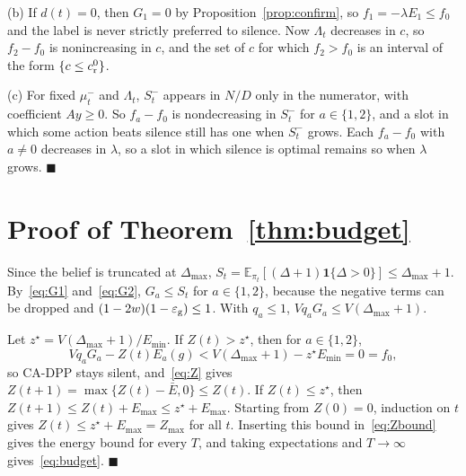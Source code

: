 \documentclass[5p,twocolumn]{elsarticle}
\theoremstyle{remark}
\newcommand{\E}{\mathbb{E}}
\newcommand{\ind}[1]{\mathbf{1}\{#1\}}
\newcommand{\ee}{\varepsilon}
\begin{document}
(b) If $d(t)=0$, then $G_1=0$ by Proposition~\ref{prop:confirm}, so $f_1=-\lambda E_1\le f_0$ and the label is never strictly preferred to silence. Now $\Lambda_t$ decreases in $c$, so $f_2-f_0$ is nonincreasing in $c$, and the set of $c$ for which $f_2>f_0$ is an interval of the form $\{c\le c^0_{\rm r}\}$.

(c) For fixed $\mu^-_t$ and $\Lambda_t$, $S^-_t$ appears in $N/D$ only in the numerator, with coefficient $Ay\ge0$. So $f_a-f_0$ is nondecreasing in $S^-_t$ for $a\in\{1,2\}$, and a slot in which some action beats silence still has one when $S^-_t$ grows. Each $f_a-f_0$ with $a\neq0$ decreases in $\lambda$, so a slot in which silence is optimal remains so when $\lambda$ grows. \hfill$\blacksquare$

\section{Proof of Theorem~\ref{thm:budget}}\label{app:budget}
Since the belief is truncated at $\Delta_{\max}$, $S_t=\E_{\pi_t}[(\Delta+1)\ind{\Delta>0}]\le\Delta_{\max}+1$. By~\eqref{eq:G1} and~\eqref{eq:G2}, $G_a\le S_t$ for $a\in\{1,2\}$, because the negative terms can be dropped and $(1-2w)(1-\ee_{\rm g})\le1$. With $q_a\le1$, $Vq_aG_a\le V(\Delta_{\max}+1)$.

Let $z^\star=V(\Delta_{\max}+1)/E_{\min}$. If $Z(t)>z^\star$, then for $a\in\{1,2\}$,
\[
Vq_aG_a-Z(t)E_a(g)<V(\Delta_{\max}+1)-z^\star E_{\min}=0=f_0,
\]
so CA-DPP stays silent, and~\eqref{eq:Z} gives $Z(t+1)=\max\{Z(t)-\bar E,0\}\le Z(t)$. If $Z(t)\le z^\star$, then $Z(t+1)\le Z(t)+E_{\max}\le z^\star+E_{\max}$. Starting from $Z(0)=0$, induction on $t$ gives $Z(t)\le z^\star+E_{\max}=Z_{\max}$ for all $t$. Inserting this bound in~\eqref{eq:Zbound} gives the energy bound for every $T$, and taking expectations and $T\to\infty$ gives~\eqref{eq:budget}. \hfill$\blacksquare$

\setlength{\bibsep}{0pt}


\end{document}
